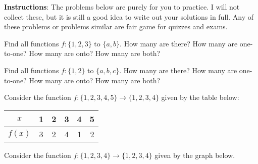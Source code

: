 \documentclass[11pt]{exam}
\begin{document}
\noindent \textbf{Instructions}: The problems below are purely for you to practice.  I will not collect these, but it is still a good idea to write out your solutions in full.  Any of these problems or problems similar are fair game for quizzes and exams.  

\begin{questions}
\question Find all functions $f: \{1,2,3\}$ to $\{a,b\}$.  How many are there?  How many are one-to-one?  How many are onto?  How many are both?

\question Find all functions $f: \{1,2\}$ to $\{a,b,c\}$.  How many are there?  How many are one-to-one?  How many are onto?  How many are both?

\question Consider the function $f:\{1,2,3,4,5\} \to \{1,2,3,4\}$ given by the table below:

\begin{center}
\begin{tabular}{c||c|c|c|c|c}
              $x$ & 1 & 2 & 3 & 4 & 5 \\ \hline
              $f(x)$ & 3 & 2 & 4 & 1 & 2
            \end{tabular}
\end{center}


\question Consider the function $f:\{1,2,3,4\} \to \{1,2,3,4\}$ given by the graph below.
\begin{multicols}{2}
\begin{center}
\end{center}




\end{multicols}
\end{questions}
\end{document}
